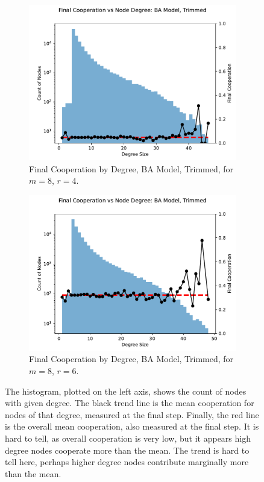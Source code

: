 \FloatBarrier 
\begin{figure}[!h]
  \begin{subfigure}[b]{0.45\textwidth}
    \includegraphics[width=1.1\textwidth]{images/Rep_BA_node_groups_m_8_phi_4_trimmed.pdf}
    \caption{Final Cooperation by Degree, BA Model, Trimmed, for $m=8$, $r=4$.   }
    \label{by_degree_m_8_phi_4}
  \end{subfigure}
  \hfill
  \begin{subfigure}[b]{0.45\textwidth}
    \includegraphics[width=1.1\textwidth]{images/Rep_BA_node_groups_m_8_phi_6_trimmed.pdf}
    \caption{Final Cooperation by Degree, BA Model, Trimmed, for $m=8$, $r=6$. }
    \label{by_degree_m_8_phi_6}
  \end{subfigure}
  \caption{The histogram, plotted on the left axis, shows the count of nodes with given degree. The black trend line is the mean cooperation for nodes of that degree, measured at the final step. Finally, the red line is the overall mean cooperation, also measured at the final step. It is hard to tell, as overall cooperation is very low, but it appears high degree nodes cooperate more than the mean. The trend is hard to tell here, perhaps higher degree nodes contribute marginally more than the mean. } \label{by_degree_m_8}
\end{figure} 
\FloatBarrier


